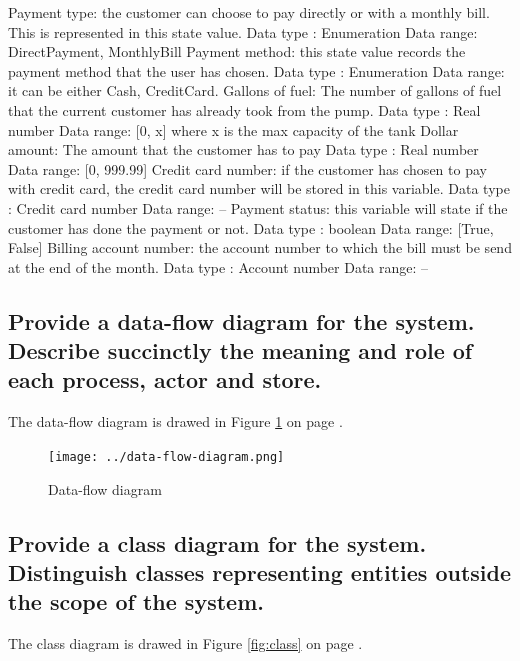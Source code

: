 \documentclass[11pt,a4paper]{article}
\begin{document}
\begin{outline}
	\1 Payment type: the customer can choose to pay directly or with a monthly bill. This is represented in this state value.
		\2 Data type : Enumeration
		\2 Data range: DirectPayment, MonthlyBill
	\1 Payment method: this state value records the payment method that the user has chosen.
		\2 Data type : Enumeration
		\2 Data range: it can be either Cash, CreditCard.
	\1 Gallons of fuel: The number of gallons of fuel that the current customer has already took from the pump.
		\2 Data type : Real number
		\2 Data range: [0, x] where x is the max capacity of the tank
	\1 Dollar amount: The amount that the customer has to pay 
		\2 Data type : Real number
		\2 Data range:  [0, 999.99]
	\1 Credit card number: if the customer has chosen to pay with credit card, the credit card number will be stored in this variable.
		\2 Data type : Credit card number
		\2 Data range: --
	\1 Payment status: this variable will state if the customer has done the payment or not.
		\2 Data type : boolean
		\2 Data range: [True, False]
	\1 Billing account number: the account number to which the bill must be send at the end of the month.
		\2 Data type : Account number
		\2 Data range: --
\end{outline}

\subsection*{Provide a data-flow diagram for the system. Describe succinctly the meaning and role of each process, actor and store.}
The data-flow diagram is drawed in Figure \ref{fig:dataflow} on page \pageref{fig:dataflow}.

\begin{figure}[H]
 \centering
 \texttt{[image: ../data-flow-diagram.png]} 
 \caption{Data-flow diagram}
 \label{fig:dataflow}
\end{figure}


\subsection*{Provide a class diagram for the system. Distinguish classes representing entities outside the scope of the system.}

The class diagram is drawed in Figure \ref{fig:class} on page \pageref{fig:class}.
\end{document}
